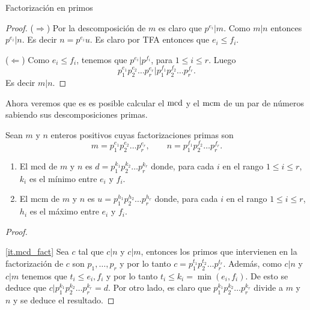 \begin{section}{Factorización en primos}
\begin{proof}
\noindent($\Rightarrow$) Por la descomposición de $m$ es claro que $p^{e_i}|m$. Como $m|n$ entonces   $p^{e_i}|n$. Es decir $n =  p^{e_i}u$. Es claro por TFA entonces que $e_i \le f_i$.

\noindent($\Leftarrow$) Como $e_i \le f_i$, tenemos que $p^{e_i}|p^{f_i}$, para $1 \le i \le r$.  Luego  $$p_1^{e_1}p_2^{e_2}\ldots p_r^{e_r}| p_1^{f_1}p_2^{f_2}\ldots p_r^{f_r}.$$ Es decir $m|n$.
\end{proof}


%


Ahora veremos que es es posible calcular el $\operatorname{mcd}$ y el $\operatorname{mcm}$ de un par de números sabiendo sus descomposiciones primas.

\begin{proposicion}
Sean $m$ y $n$ enteros positivos cuyas factorizaciones primas son
$$
m=p_1^{e_1}p_2^{e_2}\ldots p_r^{e_r},\qquad
n=p_1^{f_1}p_2^{f_2}\ldots p_r^{f_r}.
$$
\begin{enumerate}[label=\textit{\alph*)}]
    \item\label{it.mcd_fact} El mcd de $m$ y $n$ es $d=p_1^{k_1}p_2^{k_2}\ldots p_r^{k_r}$ donde, para cada $i$ en el rango $1\le i \le r$, $k_i$ es el mínimo entre $e_i$ y $f_i$.
    \item\label{it.mcm_fact} El mcm de $m$ y $n$ es $u=p_1^{h_1}p_2^{h_2}\ldots p_r^{h_r}$ donde, para cada $i$ en el rango $1\le i \le r$, $h_i$ es el máximo entre $e_i$ y $f_i$.
    \end{enumerate}
\end{proposicion}
\begin{proof}
\

\ref{it.mcd_fact} Sea $c$ tal que $c|n$ y $c|m$, entonces los primos que intervienen en la factorización de $c$ son $p_1,\ldots,p_r$ y por lo tanto $c =  p_1^{t_1}p_2^{t_2}\ldots p_r^{t_r}$. Además, como $c|n$ y $c|m$ tenemos que $t_i \le e_i,f_i$ y por lo tanto $t_i \le k_i = \min(e_i,f_i)$. De esto se deduce que $c|p_1^{k_1}p_2^{k_2}\ldots p_r^{k_r}=d$. Por otro lado, es claro  que  $p_1^{k_1}p_2^{k_2}\ldots p_r^{k_r}$ divide a $m$ y $n$ y se deduce el resultado.


\end{proof}
\end{section}
